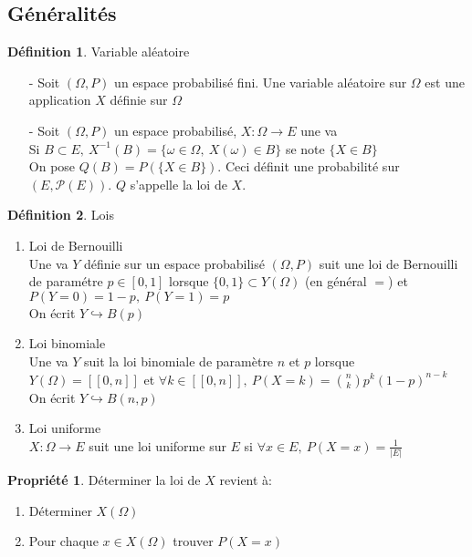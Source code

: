 \documentclass[fleqn]{article}
\theoremstyle{definition} \newtheorem*{defi}{D\'efinition}
\theoremstyle{definition} \newtheorem*{theo}{Th\'eor\`eme}
\theoremstyle{definition} \newtheorem*{coro}{Corollaire}
\theoremstyle{remark} \newtheorem*{rqs}{Remarques}
\theoremstyle{definition} \newtheorem*{prop}{Propri\'et\'e}
\begin{document}
\subsection{G\'en\'eralit\'es}
\begin{defi} Variable al\'eatoire
	\begin{itemize}
		\item [-] Soit $(\Omega, P)$ un espace probabilis\'e fini. Une variable al\'eatoire sur $\Omega$ est une application $X$ d\'efinie sur
			$\Omega$
		\item [-] Soit $(\Omega, P)$ un espace probabilis\'e, $X: \Omega \rightarrow E$ une va\\
			Si $B \subset E,\ X^{-1}(B) = \{\omega \in \Omega ,\ X(\omega) \in B\}$ se note $\{X \in B\}$\\
			On pose $Q(B) = P(\{X \in B\})$. Ceci d\'efinit une probabilit\'e sur $(E, \mathcal{P}(E))$. $Q$ s'appelle la loi de $X$.
	\end{itemize}
\end{defi}

\begin{defi} Lois
	\begin{enumerate}
		\item Loi de Bernouilli\\
			Une va $Y$ d\'efinie sur un espace probabilis\'e $(\Omega, P)$ suit une loi de Bernouilli de param\'etre $p \in [0,1]$ lorsque
			$\{0,1\} \subset Y(\Omega)$ (en g\'en\'eral $=$) et $P(Y = 0) = 1-p,\ P(Y = 1) = p$ \\
			On \'ecrit $Y \hookrightarrow B(p)$
		\item Loi binomiale \\
			Une va $Y$ suit la loi binomiale de param\`etre $n$ et $p$ lorsque $Y(\Omega) = [\![0,n]\!]$ et $\forall k \in [\![0,n]\!],\
			P(X=k) = \binom{n}{k} p^k (1-p)^{n-k}$\\
			On \'ecrit $Y \hookrightarrow B(n,p)$
		\item Loi uniforme \\
			$X: \Omega \rightarrow E$ suit une loi uniforme sur $E$ si $\forall x \in E,\ P(X = x) = \frac{1}{|E|}$
	\end{enumerate}
\end{defi}

\begin{prop} D\'eterminer la loi de $X$ revient \`a:
	\begin{enumerate}
		\item D\'eterminer $X(\Omega)$
		\item Pour chaque $x \in X(\Omega)$ trouver $P(X=x)$
	\end{enumerate}
\end{prop}
\end{document}
